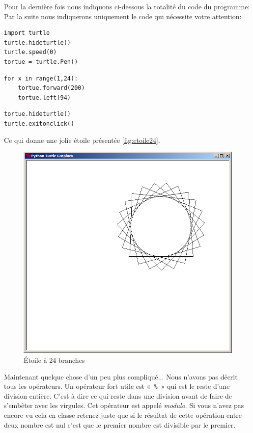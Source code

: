 Pour la dernière fois nous indiquons ci-dessous la totalité du code du programme: Par la suite nous indiquerons uniquement le code qui nécessite votre attention:
\begin{Verbatim}[frame=single,rulecolor=\color{mbleu}, label=ne sera plus rappelé]
import turtle
turtle.hideturtle()
turtle.speed(0)
tortue = turtle.Pen()
\end{Verbatim}
\begin{Verbatim}[frame=single,rulecolor=\color{mbleu}, label= à taper]
for x in range(1,24):
	tortue.forward(200)
	tortue.left(94)
\end{Verbatim}
\begin{Verbatim}[frame=single,rulecolor=\color{mbleu}, label=ne sera plus rappelé]
tortue.hideturtle()
turtle.exitonclick()
\end{Verbatim}
 
Ce qui donne une jolie étoile présentée \autoref{fig:etoile24}.
\begin{figure}[H]
\centering
\includegraphics[scale=0.4]{images/etoile24}
\caption{Étoile à 24 branches}\label{fig:etoile24}
\end{figure}

Maintenant quelque chose d'un peu plus compliqué... Nous n'avons pas décrit tous les opérateurs. Un opérateur fort utile est «~\texttt{\%}~» qui est le reste d'une division entière. C'est à dire ce qui reste dans une division avant de faire de s'embêter avec les virgules. Cet opérateur est appelé \emph{modulo}. Si vous n'avez pas encore vu cela en classe retenez juste que si le résultat de cette opération entre deux nombre est nul c'est que le premier nombre est divisible par le premier.


